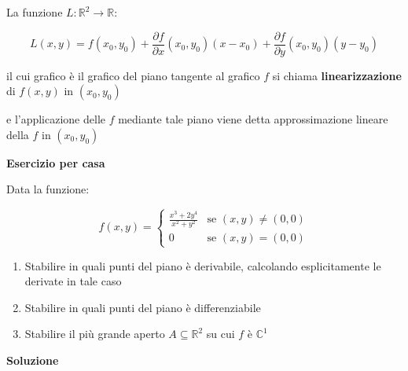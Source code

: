 \documentclass[11pt]{article}
\begin{document}
La funzione $L: \mathbb{R}^{2} \rightarrow \mathbb{R}$:

\[
    L(x,y) = f(x_0,y_0) + \frac{\partial f}{\partial x}(x_0,y_0) (x-x_0) + \frac{\partial f}{\partial y}(x_0,y_0) (y-y_0)
\]

il cui grafico è il grafico del piano tangente al grafico $f$ si chiama \textbf{linearizzazione} di $f(x,y)$ in $(x_0,y_0)$


e l'applicazione delle $f$ mediante tale piano viene detta approssimazione lineare della $f$ in $(x_0,y_0)$

\textbf{Esercizio per casa} 

Data la funzione:

\[
    f(x,y) = \begin{cases}
        \frac{x^{3}+2y^{4}}{x^{2}+y^{2}} & \text{se $(x,y) \neq (0,0)$} \\
        0 & \text{se $(x,y) = (0,0)$}
    \end{cases}
\]

\begin{enumerate}
    \item Stabilire in quali punti del piano è derivabile, calcolando esplicitamente le derivate in tale caso
    \item Stabilire in quali punti del piano è differenziabile
    \item Stabilire il più grande aperto $A \subseteq \mathbb{R}^{2}$ su cui $f$ è $\mathbb{C}^{1}$
\end{enumerate}

\textbf{Soluzione} 
\end{document}
